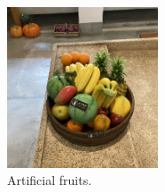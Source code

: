 \documentclass[12pt]{article}
\theoremstyle{definition}
\begin{document}
\begin{figure}[ht]
    \centering
    \includegraphics[width=0.4\textwidth]{ch2_figures/result_compression_fruit_orig.png}
    \caption[LOF]{Artificial fruits.\protect\footnotemark}
    \label{fig:original_fruits}
\end{figure}
\end{document}

